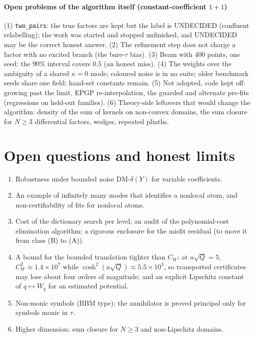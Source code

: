 \documentclass[11pt]{article}
\theoremstyle{plain}
\theoremstyle{definition}
\theoremstyle{remark}
\newcommand{\lab}[1]{\textsf{#1}}           %
\newcommand{\UND}{\lab{UNDECIDED}}
\begin{document}
\paragraph{Open problems of the algorithm itself (constant-coefficient $1{+}1$)} (1) \texttt{two\_pairs}: the true factors are kept but the label is \UND{} (confluent relabelling); the work was started and stopped unfinished, and \UND{} may be the correct honest answer. (2) The refinement step does not charge a factor with no excited branch (the bare-$\tau$ bias). (3) Beam with $400$ points, one seed: the $90\%$ interval covers $0.5$ (an honest miss). (4) The weights over the ambiguity of a shared $\kappa=0$ mode; coloured noise is in no suite; older benchmark seeds share one field; hand-set constants remain.
(5) Not adopted, code kept off: growing past the limit, EPGP re-interpolation, the guarded and alternate pre-fits (regressions on held-out families). (6) Theory-side leftovers that would change the algorithm: density of the sum of kernels on non-convex domains, the sum closure for $N\ge3$ differential factors, wedges, repeated plinths.



\section{Open questions and honest limits}\label{sec:open}
\begin{enumerate}
\item Robustness under bounded noise $\mathrm{DM}\text{-}\delta(Y)$ for variable coefficients.
\item An example of infinitely many modes that identifies a nonlocal atom, and non-certifiability of fits for nonlocal atoms.
\item Cost of the dictionary search per level; an audit of the polynomial-cost elimination algorithm; a rigorous enclosure for the misfit residual (to move it from class (B) to (A)).
\item A bound for the bounded translation tighter than $C_W$: at $a\sqrt Q=5$, $C_W^2\approx1.4\times10^7$ while $\cosh^2(a\sqrt Q)\approx5.5\times10^3$, so transported certificates may lose about four orders of magnitude; and an explicit Lipschitz constant of $q\mapsto W_q$ for an estimated potential.
\item Non-monic symbols (BBM type): the annihilator is proved principal only for symbols monic in $\tau$.
\item Higher dimension: sum closure for $N\ge3$ and non-Lipschitz domains.
\end{enumerate}
\end{document}
